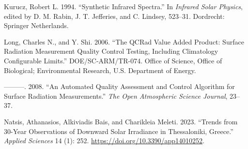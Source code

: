 \documentclass[
]{article}
\newlength{\cslhangindent}
\newlength{\cslentryspacingunit} %
\newenvironment{CSLReferences}[2] %
 {%
  \setlength{\parindent}{0pt}
  \ifodd #1
  \let\oldpar\par
  \def\par{\hangindent=\cslhangindent\oldpar}
  \fi
  \setlength{\parskip}{#2\cslentryspacingunit}
 }%
 {}
\begin{document}
\begin{CSLReferences}{1}{0}
\leavevmode{}%
Kurucz, Robert L. 1994. {``Synthetic Infrared Spectra.''} In \emph{Infrared Solar Physics}, edited by D. M. Rabin, J. T. Jefferies, and C. Lindsey, 523--31. Dordrecht: Springer Netherlands.

\leavevmode{}%
Long, Charles N., and Y. Shi. 2006. {``The QCRad Value Added Product: Surface Radiation Measurement Quality Control Testing, Including Climatology Configurable Limits.''} DOE/SC-ARM/TR-074. Office of Science, Office of Biological; Environmental Research, U.S. Department of Energy.

\leavevmode{}%
---------. 2008. {``An Automated Quality Assessment and Control Algorithm for Surface Radiation Measurements.''} \emph{The Open Atmospheric Science Journal}, 23--37.

\leavevmode{}%
Natsis, Athanasios, Alkiviadis Bais, and Charikleia Meleti. 2023. {``Trends from 30-Year Observations of Downward Solar Irradiance in Thessaloniki, Greece.''} \emph{Applied Sciences} 14 (1): 252. \url{https://doi.org/10.3390/app14010252}.

\end{CSLReferences}
\end{document}
